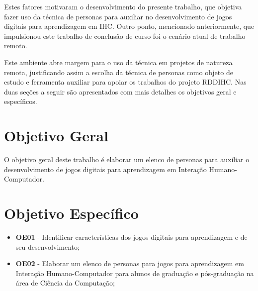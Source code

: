Estes fatores motivaram o desenvolvimento do presente trabalho, que objetiva fazer uso da técnica de personas para auxiliar no desenvolvimento de jogos digitais para aprendizagem em IHC. Outro ponto, mencionado anteriormente, que impulsionou este trabalho de conclusão de curso foi o cenário atual de trabalho remoto. 

Este ambiente abre margem para o uso da técnica em projetos de natureza remota, justificando assim a escolha da técnica de personas como objeto de estudo e ferramenta auxiliar para apoiar os trabalhos do projeto RDDIHC. Nas duas seções a seguir são apresentados com mais detalhes os objetivos geral e específicos.


\section{Objetivo Geral}
\label{sec:objetivos}

O objetivo geral deste trabalho é elaborar um elenco de personas para auxiliar o desenvolvimento de jogos digitais para aprendizagem em Interação Humano-Computador.

\section{Objetivo Específico}
\label{ssec:obj_especifico}
\begin{itemize}

    
     \item \textbf{OE01} - Identificar características dos jogos digitais para aprendizagem e de seu desenvolvimento;
     
     \item \textbf{OE02} - Elaborar um elenco de personas para jogos para aprendizagem em Interação Humano-Computador para alunos de graduação e pós-graduação na área de Ciência da Computação;
    
    
\end{itemize}

